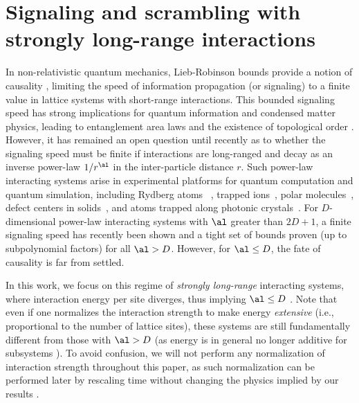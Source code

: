 \chapter{Signaling and scrambling with strongly long-range interactions}
\label{ch:vlr}
In non-relativistic quantum mechanics, Lieb-Robinson bounds provide a notion of causality \cite{LR}, limiting the speed of information propagation (or signaling) to a finite value in lattice systems with short-range interactions. This bounded signaling speed has strong implications for quantum information and condensed matter physics, leading to entanglement area laws \cite{Hastings07} and the existence of topological order \cite{BravyiHM10}.
However, it has remained an open question until recently as to whether the signaling speed must be finite if interactions are long-ranged and decay as an inverse power-law $1/r^{\al}$ in the inter-particle distance $r$.
Such power-law interacting systems arise in experimental platforms for quantum computation and quantum simulation, including Rydberg atoms ~\cite{Saffman10}, trapped ions~\cite{Britton12}, polar molecules~\cite{Yan13}, defect centers in solids~\cite{Yao12}, and atoms trapped along photonic crystals~\cite{Douglas15}.
For $D$-dimensional power-law interacting systems with $\al$ greater than $2D+1$, a finite signaling speed has recently been shown \cite{Chen2019,kuwaharaStrictlyLinearLight2020} and a tight set of bounds proven (up to subpolynomial factors) for all $\al > D$.
However, for $\al \le D$, the fate of causality is far from settled.


In this work, we focus on this regime of \emph{strongly long-range} interacting systems, where interaction energy per site diverges, thus implying $\al\le D$ \cite{Kastner11,Kastner12, Storch15, Kastner17}.
Note that even if one normalizes the interaction strength to make energy \emph{extensive} (i.e., proportional to the number of lattice sites), these systems are still fundamentally different from those with $\al >D$ (as energy is in general no longer additive for subsystems \cite{Dauxois}).
To avoid confusion, we will not perform any normalization of interaction strength throughout this paper, as such normalization can be performed later by rescaling time  without changing the physics implied by our results \cite{Storch15}.

